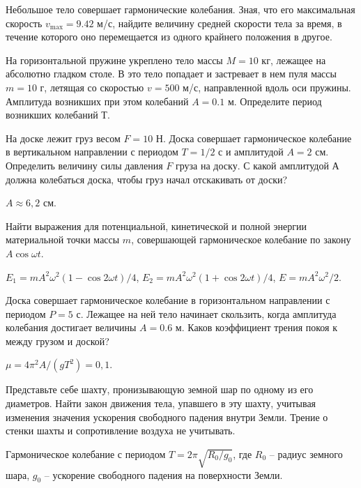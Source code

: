 \begin{ex}
Небольшое тело совершает гармонические колебания. Зная, что его максимальная скорость $v_{\max} = 9.42$ м/с, найдите величину средней скорости тела за время, в течение которого оно перемещается из одного крайнего положения в другое.
\end{ex}	

\begin{ex}
На горизонтальной пружине укреплено тело массы $M = 10$ кг, лежащее на абсолютно гладком столе. В это тело попадает и застревает в нем пуля массы $m = 10$ г, летящая со скоростью $v = 500$ м/с, направленной вдоль оси пружины. Амплитуда возникших при этом колебаний $A = 0.1$ м. Определите период возникших колебаний $Т$.
\end{ex}	

\begin{ex} %
На доске лежит груз весом $F = 10$ Н. Доска совершает гармоническое колебание в вертикальном направлении с периодом $T = 1/2$ с и амплитудой $A = 2$ см. Определить величину силы давления $F$ груза на доску. С какой амплитудой А должна колебаться доска, чтобы груз начал отскакивать от доски?
\begin{ans}
$A \approx 6,2$ см.
\end{ans}
\end{ex}	

\begin{ex} %
Найти выражения для потенциальной, кинетической и полной энергии материальной точки массы $m$, совершающей гармоническое колебание по закону $A \cos \omega t$.
\begin{ans}
$E_1 = m A^2 \omega^2 (1 - \cos 2 \omega t)/4$, $E_2 = m A^2 \omega^2 (1 + \cos 2 \omega t)/4$, $E = m A^2 \omega^2 /2$.
\end{ans}
\end{ex}	

\begin{ex} %
Доска совершает гармоническое колебание в горизонтальном направлении с периодом $P = 5$ с. Лежащее на ней тело начинает скользить, когда амплитуда колебания достигает величины $A = 0.6$ м. Каков коэффициент трения покоя к между грузом и доской?
\begin{ans}
$\mu = 4 \pi^2 A / (gT^2) = 0,1$.
\end{ans}
\end{ex}	

\complexProblems

\begin{ex} %
Представьте себе шахту, пронизывающую земной шар по одному из его диаметров. Найти закон движения тела, упавшего в эту шахту, учитывая изменения значения ускорения свободного падения внутри Земли. Трение о стенки шахты и сопротивление воздуха не учитывать.
\begin{ans}
Гармоническое колебание с периодом $T = 2 \pi \sqrt{R_0 / g_0}$, где $R_0$ -- радиус земного шара, $g_0$ -- ускорение свободного падения на поверхности Земли.
\end{ans}
\end{ex}	

